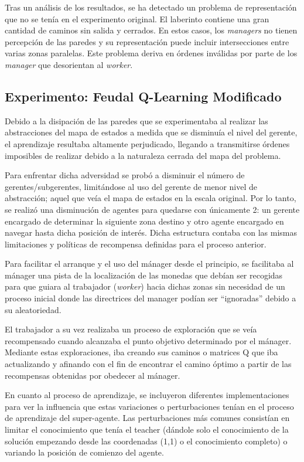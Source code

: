\documentclass[letterpaper]{article} %
\begin{document}
Tras un análisis de los resultados, se ha detectado un problema de representación que no se tenía en el experimento original. El laberinto contiene 
una gran cantidad de caminos sin salida y cerrados. En estos casos, los \textit{managers} no tienen percepción de las paredes y su representación puede incluir
intersecciones entre varias zonas paralelas. Este problema deriva en órdenes inválidas por parte de los \textit{manager} que desorientan al \textit{worker}. 

\subsection{Experimento: Feudal Q-Learning Modificado}

Debido a la disipación de las paredes que se experimentaba al realizar las abstracciones del mapa de estados a medida que se disminuía
el nivel del gerente, el aprendizaje resultaba altamente perjudicado, llegando a transmitirse órdenes imposibles de realizar debido a la
naturaleza cerrada del mapa del problema.

Para enfrentar dicha adversidad se probó a disminuir el número de gerentes/subgerentes, limitándose al uso del gerente de menor nivel
de abstracción; aquel que veía el mapa de estados en la escala original. Por lo tanto, se realizó una disminución de agentes para 
quedarse con únicamente 2: un gerente encargado de determinar la siguiente zona destino y otro agente encargado en navegar hasta 
dicha posición de interés. Dicha estructura contaba con las mismas limitaciones y políticas de recompensa definidas para el proceso anterior.

Para facilitar el arranque y el uso del mánager desde el principio, se facilitaba al mánager una pista de la localización de las monedas que 
debían ser recogidas para que guiara al trabajador (\textit{worker}) hacia dichas zonas sin necesidad de un proceso inicial donde las directrices del
manager podían ser “ignoradas” debido a su aleatoriedad. 

El trabajador a su vez realizaba un proceso de exploración que se veía recompensado cuando alcanzaba el punto objetivo determinado por el mánager.
Mediante estas exploraciones, iba creando sus caminos o matrices Q que iba actualizando y afinando con el fin de encontrar el camino óptimo a
partir de las recompensas obtenidas por obedecer al mánager.

En cuanto al proceso de aprendizaje, se incluyeron diferentes implementaciones para ver la influencia que estas variaciones o perturbaciones
tenían en el proceso de aprendizaje del super-agente. Las perturbaciones más comunes consistían en limitar el conocimiento que tenía el 
teacher (dándole solo el conocimiento de la solución empezando desde las coordenadas (1,1) o el conocimiento completo) o variando la posición
de comienzo del agente.
\end{document}
